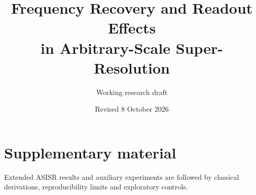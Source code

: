 \documentclass[10pt,twocolumn]{article}
\title{Frequency Recovery and Readout Effects\\
in Arbitrary-Scale Super-Resolution}
\author{Working research draft}
\date{Revised 8 October 2026}
\theoremstyle{definition}\newtheorem{definition}{Definition}
\begin{document}
\maketitle












\clearpage
\appendix
\section*{Supplementary material}
Extended ASISR results and auxiliary experiments are followed by classical derivations, reproducibility limits and exploratory controls.


\end{document}
